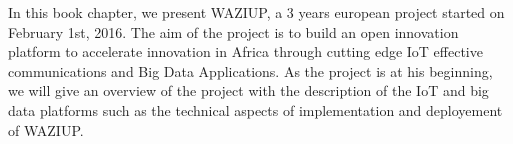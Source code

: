 In this book chapter, we present WAZIUP, a 3 years european project started on February 1st, 2016. 
The aim of the project is to build an open innovation platform to accelerate innovation in Africa through cutting edge IoT effective communications and Big Data Applications. 
As the project is at his beginning, we will give an overview of the project with the description of the IoT and big data platforms such as the technical aspects of implementation and deployement of WAZIUP. 
